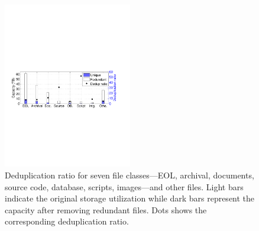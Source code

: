 \begin{figure} 
	\centering
	\includegraphics[width=0.5\textwidth]{graphs/dedup-overall} 
	\caption{Deduplication ratio for seven file classes---EOL, archival, documents, source code, database, scripts, images---and other files.
	Light bars indicate the original storage utilization while dark bars represent the capacity after removing redundant files.
	Dots shows the corresponding deduplication ratio.
%
%
} 
	\label{fig:dedup-overall} 
\end{figure}


